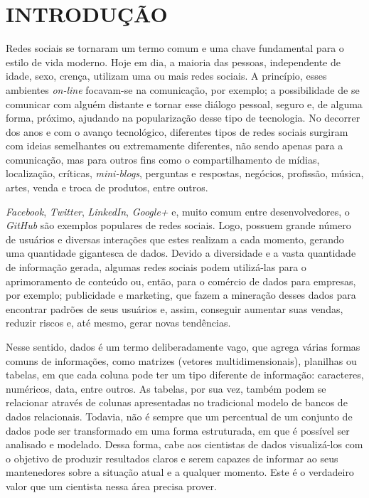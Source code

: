 \chapter{INTRODUÇÃO}\label{ch:introducao}

Redes sociais se tornaram um termo comum e uma chave fundamental para o estilo de vida moderno. Hoje em dia, a maioria das pessoas, independente de idade, sexo, crença, utilizam uma ou mais redes sociais. A princípio, esses ambientes \textit{on-line} focavam-se na comunicação, por exemplo; a possibilidade de se comunicar com alguém distante e tornar esse diálogo pessoal, seguro e, de alguma forma, próximo, ajudando na popularização desse tipo de tecnologia. No decorrer dos anos e com o avanço tecnológico, diferentes tipos de redes sociais surgiram com ideias semelhantes ou extremamente diferentes, não sendo apenas para a comunicação, mas para outros fins como o compartilhamento de mídias, localização, críticas, \textit{mini-blogs}, perguntas e respostas, negócios, profissão, música, artes, venda e troca de produtos, entre outros.

\textit{Facebook}, \textit{Twitter}, \textit{LinkedIn}, \textit{Google+} e, muito comum entre desenvolvedores, o \textit{GitHub} são exemplos populares de redes sociais. Logo, possuem grande número de usuários e diversas interações que estes realizam a cada momento, gerando uma quantidade gigantesca de dados. Devido a diversidade e a vasta quantidade de informação gerada, algumas redes sociais podem utilizá-las para o aprimoramento de conteúdo ou, então, para o comércio de dados para empresas, por exemplo; publicidade e marketing, que fazem a mineração desses dados para encontrar padrões de seus usuários e, assim, conseguir aumentar suas vendas, reduzir riscos e, até mesmo, gerar novas tendências.

Nesse sentido, dados é um termo deliberadamente vago, que agrega várias formas comuns de informações, como matrizes (vetores multidimensionais), planilhas ou tabelas, em que cada coluna pode ter um tipo diferente de informação: caracteres, numéricos, data, entre outros. As tabelas, por sua vez, também podem se relacionar através de colunas apresentadas no tradicional modelo de bancos de dados relacionais. Todavia, não é sempre que um percentual de um conjunto de dados pode ser transformado em uma forma estruturada, em que é possível ser analisado e modelado. Dessa forma, cabe aos cientistas de dados visualizá-los com o objetivo de produzir resultados claros e serem capazes de informar ao seus mantenedores sobre a situação atual e a qualquer momento. Este é o verdadeiro valor que um cientista nessa área precisa prover.

